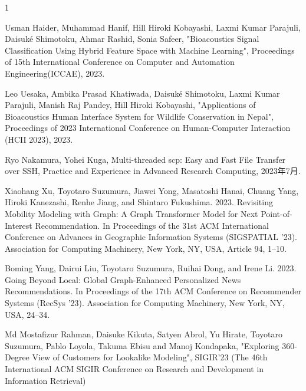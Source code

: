 \begin{査読付}{1}


 Usman Haider, Muhammad Hanif, Hill Hiroki Kobayashi, Laxmi Kumar Parajuli, Daisuké Shimotoku, Ahmar Rashid, Sonia Safeer, "Bioacoustics Signal Classification Using Hybrid Feature Space with Machine Learning", Proceedings of 15th International Conference on Computer and Automation Engineering(ICCAE), 2023.  

 Leo Uesaka, Ambika Prasad Khatiwada, Daisuk\'e Shimotoku, Laxmi Kumar Parajuli, Manish Raj Pandey, Hill Hiroki Kobayashi, "Applications of Bioacoustics Human Interface System for Wildlife Conservation in Nepal", Proceedings of 2023 International Conference on Human-Computer Interaction (HCII 2023), 2023.  

Ryo Nakamura, Yohei Kuga, Multi-threaded scp: Easy and Fast File Transfer over SSH, Practice and Experience in Advanced Research Computing, 2023年7月.


Xiaohang Xu, Toyotaro Suzumura, Jiawei Yong, Masatoshi Hanai, Chuang Yang, Hiroki Kanezashi, Renhe Jiang, and Shintaro Fukushima. 2023. Revisiting Mobility Modeling with Graph: A Graph Transformer Model for Next Point-of-Interest Recommendation. In Proceedings of the 31st ACM International Conference on Advances in Geographic Information Systems (SIGSPATIAL '23). Association for Computing Machinery, New York, NY, USA, Article 94, 1–10.

Boming Yang, Dairui Liu, Toyotaro Suzumura, Ruihai Dong, and Irene Li. 2023. Going Beyond Local: Global Graph-Enhanced Personalized News Recommendations. In Proceedings of the 17th ACM Conference on Recommender Systems (RecSys '23). Association for Computing Machinery, New York, NY, USA, 24–34.

Md Mostafizur Rahman, Daisuke Kikuta, Satyen Abrol, Yu Hirate, Toyotaro Suzumura, Pablo Loyola, Takuma Ebisu and Manoj Kondapaka, "Exploring 360-Degree View of Customers for Lookalike Modeling",  SIGIR'23 (The 46th International ACM SIGIR Conference on Research and Development in Information Retrieval) 


\end{査読付}
